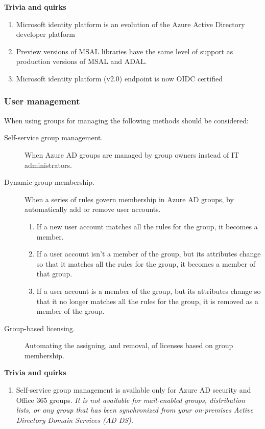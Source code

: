 \textbf{Trivia and quirks} 
\begin{enumerate}
\item Microsoft identity platform is an evolution of the Azure Active Directory developer platform
\item Preview versions of MSAL libraries have the same level of support as production versions of MSAL and ADAL.
\item Microsoft identity platform (v2.0) endpoint is now OIDC certified
\end{enumerate}

\subsubsection{User management}
When using groups for managing the following methods should be considered:
\begin{description}
\item[Self-service group management.] When Azure AD groups are managed by group owners instead of IT administrators.
\item[Dynamic group membership.] When a series of rules govern membership in Azure AD groups, by automatically add or remove user accounts. \begin{enumerate} \item If a new user account matches all the rules for the group, it becomes a member. \item If a user account isn’t a member of the group, but its attributes change so that it matches all the rules for the group, it becomes a member of that group. \item If a user account is a member of the group, but its attributes change so that it no longer matches all the rules for the group, it is removed as a member of the group. \end{enumerate}
\item[Group-based licensing.] Automating the assigning, and removal, of licenses based on group membership.
\end{description}

\textbf{Trivia and quirks} 
\begin{enumerate}
\item Self-service group management is available only for Azure AD security and Office 365 groups. \textit{It is not available for mail-enabled groups, distribution lists, or any group that has been synchronized from your on-premises Active Directory Domain Services (AD DS).}
\end{enumerate}

